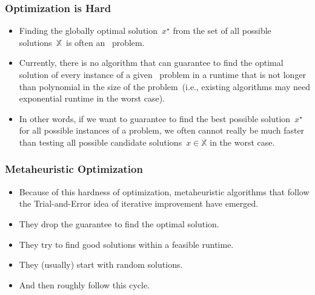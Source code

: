 \documentclass[aspectratio=169,mathserif,notheorems]{beamer}%
\gdef\searchSpace{\ensuremath{\mathbb{X}}}%
\gdef\sespel{\ensuremath{x}}%
\gdef\opti#1{\ensuremath{#1^{\star}}}%
\begin{document}
\begin{frame}[t]%
\frametitle{Optimization is Hard}%
\begin{itemize}%
%
\item Finding the globally optimal solution~\opti{\sespel} from the set of all possible solutions~\searchSpace\ is often an \npHard\ problem.%
%
\item<2-> Currently, there is no algorithm that can \alert{guarantee} to find the optimal solution of \alert{every instance} of a given \npHard\ problem in a runtime that is not longer than polynomial in the size of the problem~(i.e., existing algorithms may need exponential runtime in the \alert{worst case}).%
%
\item<4-> In other words, if we want to guarantee to find the best possible solution~\opti{\sespel} for all possible instances of a problem, we often cannot really be much faster than testing all possible candidate solutions~$\sespel\in\searchSpace$ in the \alert{worst case}.%
%
\end{itemize}%
%
%
%
\end{frame}%
%
\begin{frame}%
\frametitle{Metaheuristic Optimization}%
\parbox{0.42\paperwidth}{%
\begin{itemize}%
%
\item Because of this hardness of optimization, metaheuristic algorithms that follow the Trial-and-Error idea of iterative improvement have emerged.%
\item<2-> They drop the guarantee to find the optimal solution.%
\item<3-> They try to find good solutions within a feasible runtime.%
\item<4-> They (usually) start with random solutions.%
\item<5-> And then roughly follow this cycle.%
%
\end{itemize}%
}%
%
%
%
%
%
%
%
%
%
%
%
%
%
%
%
\end{frame}%
\end{document}
